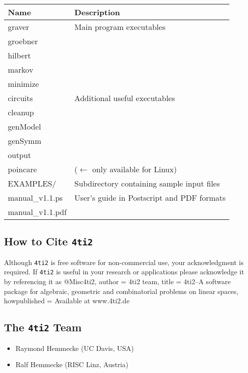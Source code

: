 \documentclass[12pt]{article}
\newenvironment{myverbatim}%
  {\quote\verbatim}%
  {\endverbatim\endquote}
\theoremstyle{definition}
\newcommand{\FourTiTwo}{{\tt 4ti2}}
\begin{document}
\begin{tabular}{|l|l|}
\hline
Name & Description\\
\hline 
graver & Main program executables\\
groebner & \\
hilbert & \\
markov & \\
minimize & \\
\hline
circuits & Additional useful executables\\
cleanup & \\
genModel & \\
genSymm & \\
output & \\
poincare & ($\gets$ only available for Linux)\\ 
\hline
EXAMPLES/ & Subdirectory containing sample input files\\
\hline
manual\_v1.1.ps & User's guide in Postscript and PDF formats\\
manual\_v1.1.pdf & \\
\hline 
\end{tabular}






\subsection{How to Cite \FourTiTwo{}}

Although \FourTiTwo{} is free software for non-commercial use, your
acknowledgment is required. If \FourTiTwo{} is useful in your research
or applications please acknowledge it by referencing it as 
\begin{myverbatim}
@Misc{4ti2,
  author = {4ti2 team},
  title  = {4ti2--A software package for algebraic, geometric
            and combinatorial problems on linear spaces},
  howpublished = {Available at www.4ti2.de}
}
\end{myverbatim}




\subsection{The \FourTiTwo{} Team}
\begin{itemize}
\item Raymond Hemmecke (UC Davis, USA)
\item Ralf Hemmecke (RISC Linz, Austria)
\end{itemize}
\end{document}
